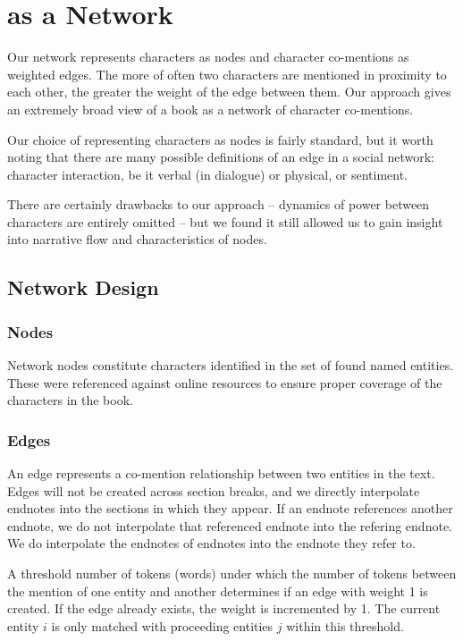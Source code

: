 \section{\infinitejest as a Network}

Our network represents characters as nodes and character co-mentions as weighted edges. The more of often two characters are mentioned in proximity to each other, the greater the weight of the edge between them. Our approach gives an extremely broad view of a book as a network of character co-mentions.

Our choice of representing characters as nodes is fairly standard, but it worth noting that there are many possible definitions of an edge in a social network: character interaction, be it verbal (in dialogue) or physical, or sentiment. 

There are certainly drawbacks to our approach -- dynamics of power between characters are entirely omitted -- but we found it still allowed us to gain insight into narrative flow and characteristics of nodes.

\subsection{Network Design}

\subsubsection{Nodes}
Network nodes constitute characters identified in the set of found named entities. These were referenced against online resources to ensure proper coverage of the characters in the book.\cite{david_foster_wallace_wiki}

\subsubsection{Edges}
An edge represents a co-mention relationship between two entities in the text. Edges will not be created across section breaks, and we directly interpolate endnotes into the sections in which they appear. If an endnote references another endnote, we do not interpolate that referenced endnote into the refering endnote. We do interpolate the endnotes of endnotes into the endnote they refer to.

A threshold number of tokens (words) under which the number of tokens between the mention of one entity and another determines if an edge with weight 1 is created. If the edge already exists, the weight is incremented by 1. The current entity $i$ is only matched with proceeding entities $j$ within this threshold.

